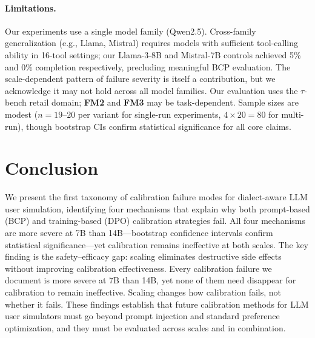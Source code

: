 \documentclass[11pt,a4paper]{article}
\newcommand{\fm}[1]{\textbf{FM#1}}
\begin{document}
\paragraph{Limitations.}
Our experiments use a single model family (Qwen2.5).
Cross-family generalization (e.g., Llama, Mistral) requires models with sufficient tool-calling ability in 16-tool settings; our Llama-3-8B and Mistral-7B controls achieved 5\% and 0\% completion respectively, precluding meaningful BCP evaluation.
The scale-dependent pattern of failure severity is itself a contribution, but we acknowledge it may not hold across all model families.
Our evaluation uses the $\tau$-bench retail domain; \fm{2} and \fm{3} may be task-dependent.
Sample sizes are modest ($n{=}19$--$20$ per variant for single-run experiments, $4 \times 20{=}80$ for multi-run), though bootstrap CIs confirm statistical significance for all core claims.

\section{Conclusion}
\label{sec:conclusion}

We present the first taxonomy of calibration failure modes for dialect-aware LLM user simulation, identifying four mechanisms that explain why both prompt-based (BCP) and training-based (DPO) calibration strategies fail.
All four mechanisms are more severe at 7B than 14B---bootstrap confidence intervals confirm statistical significance---yet calibration remains ineffective at both scales.
The key finding is the safety--efficacy gap: scaling eliminates destructive side effects without improving calibration effectiveness.
Every calibration failure we document is more severe at 7B than 14B, yet none of them need disappear for calibration to remain ineffective.
Scaling changes how calibration fails, not whether it fails.
These findings establish that future calibration methods for LLM user simulators must go beyond prompt injection and standard preference optimization, and they must be evaluated across scales and in combination.
\end{document}
